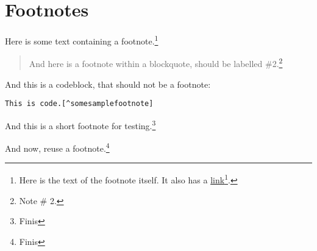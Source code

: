 
\def\mytitle{MultiMarkdown Footer Test}


\part{Footnotes}
\label{footnotes}

Here is some text containing a footnote.\footnote{Here is the text of the footnote itself. It also has a \href{http://somelink.com}{link}\footnote{\href{http://somelink.com}{http:/\slash somelink.com}}.}

\begin{quote}

And here is a footnote within a blockquote, should be labelled \#2.\footnote{Note \# 2.}
\end{quote}

And this is a codeblock, that should not be a footnote:

\begin{verbatim}
This is code.[^somesamplefootnote]
\end{verbatim}

And this is a short footnote for testing.\footnote{Finis}

And now, reuse a footnote.\footnote{Finis}




